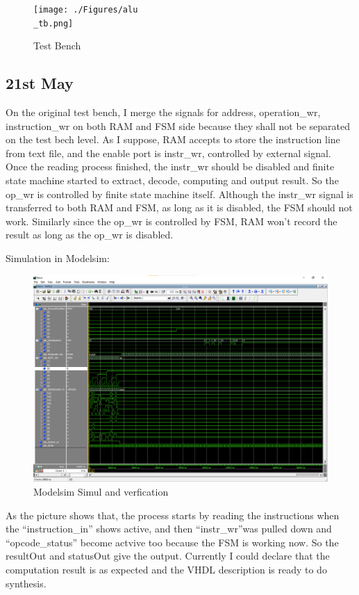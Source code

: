 \begin{figure}[!h]
    \centerline{\texttt{[image: ./Figures/alu\\\_tb.png]}}
    \caption{Test Bench \label{fig01} }
\end{figure}

\subsection{21st May}
On the original test bench, I merge the signals for address, operation\_wr, 
instruction\_wr on both RAM and FSM side because they shall not be separated on the test bech level. 
As I suppose, RAM accepts to store the instruction line from text file, and the enable port is instr\_wr, 
controlled by external signal. Once the reading process finished, the instr\_wr should be disabled and finite state machine started to extract, 
decode, computing and output result. So the op\_wr is controlled by finite state machine itself. Although the instr\_wr signal is transferred to both RAM and FSM, 
as long as it is disabled, the FSM should not work.  Similarly since the op\_wr is controlled by FSM, RAM won’t record the result as long as the op\_wr is disabled.

Simulation in Modelsim:
\begin{figure}[!h]
    \centerline{\includegraphics[width=15cm]{./Figures/waveform_modelsim.png}}
    \caption{Modelsim Simul and verfication \label{fig1} }
\end{figure}

As the picture shows that, the process starts by reading the instructions when the ``instruction\_in''
shows active, and then ``instr\_wr''was pulled down and ``opcode\_status'' become actvive too because the FSM
is working now. So the resultOut and statusOut give the output. Currently I could declare that
the computation result is as expected and the VHDL description is ready to do synthesis.

